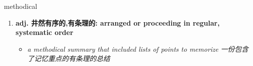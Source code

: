 
\begin{frame}
{\huge methodical}
\begin{center}
\begin{enumerate}\Large
  \item \textbf{adj. 井然有序的,有条理的: arranged or proceeding in regular, systematic order}
  \begin{itemize}
    \item \em{\Large{a methodical summary that included lists of points to memorize 一份包含了记忆重点的有条理的总结}}
  \end{itemize}
\end{enumerate}
\end{center}
\end{frame}
